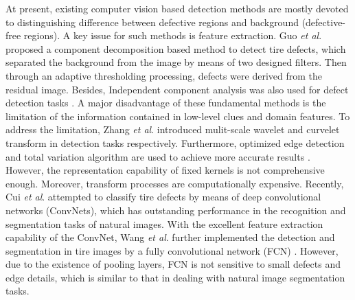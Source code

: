 \documentclass{article}
\begin{document}
At present, existing computer vision based detection methods are mostly devoted to distinguishing difference between defective regions and background (defective-free regions). A key issue for such methods is feature extraction. Guo {\it et al}. \cite{guo2012tire} proposed a component decomposition based method to detect tire defects, which separated the background from the image by means of two designed filters. Then through an adaptive thresholding processing, defects were derived from the residual image. Besides, Independent component analysis was also used for defect detection tasks \cite{cui2016defect,cui2016novel}. A major disadvantage of these fundamental methods is the limitation of the information contained in low-level clues and domain features. To address the limitation, Zhang {\it et al}. \cite{zhang2013defect,zhang2015automatic} introduced mulit-scale wavelet and curvelet transform in detection tasks respectively. Furthermore, optimized edge detection and total variation algorithm are used to achieve more accurate results \cite{yan2013detection}. However, the representation capability of fixed kernels is not comprehensive enough. Moreover, transform processes are computationally expensive. Recently, Cui {\it et al}. \cite{cui2018tire} attempted to classify tire defects by means of deep convolutional networks (ConvNets), which has outstanding performance in the recognition and segmentation tasks of natural images. With the excellent feature extraction capability of the ConvNet, Wang {\it et al}. \cite{wang2019tire} further implemented the detection and segmentation in tire images by a fully convolutional network (FCN) \cite{long2015fully}. However, due to the existence of pooling layers, FCN is not sensitive to small defects and edge details, which is similar to that in dealing with natural image segmentation tasks.
\end{document}
